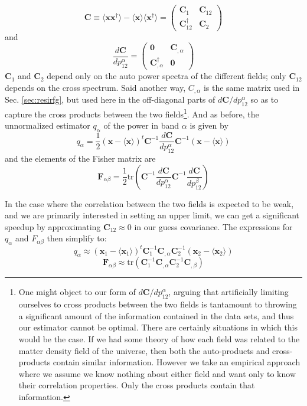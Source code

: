 \documentclass[numberedappendix]{emulateapj}
\newcommand{\Fb}{\mathbf{F}}
\newcommand{\Cb}{\mathbf{C}}
\newcommand{\xb}{\mathbf{x}}
\begin{document}
\begin{equation}
\Cb\equiv  \langle\xb\xb^\dagger\rangle-\langle\xb\rangle\langle\xb^\dagger\rangle=\left(\begin{matrix}\Cb_1 & \Cb_{12} \\ \Cb_{12}^\dagger & \Cb_2   \end{matrix}\right)
\end{equation}
and 
\begin{equation}
\frac{d\Cb}{dp_{12}^\alpha}=\left(\begin{matrix}\mathbf{0} & \Cb_{,\alpha}\\ \Cb_{,\alpha}^\dagger & \mathbf{0}   \end{matrix}\right)
\end{equation}
$\Cb_1$ and $\Cb_2$ depend only on the auto power spectra of the different fields; only $\Cb_{12}$ depends on the cross spectrum. Said another way, $C_{,\alpha}$ is the same matrix used in Sec. \ref{sec:resirfg}, but used here in the off-diagonal parts of $d\Cb/dp_{12}^\alpha$ so as to capture the cross products between the two fields\footnote{One might object to our form of $d\Cb/dp_{12}^\alpha$, arguing that artificially limiting ourselves to cross products between the two fields is tantamount to throwing a significant amount of the information contained in the data sets, and thus our estimator cannot be optimal. There are certainly situations in which this would be the case. If we had some theory of how each field was related to the matter density field of the universe, then both the auto-products and cross-products contain similar information. However we take an empirical approach where we assume we know nothing about either field and want only to know their correlation properties. Only the cross products contain that information.}. And as before, the unnormalized estimator $q_\alpha$ of the power in band $\alpha$ is given by
\begin{equation}
q_\alpha = \frac{1}{2}(\xb-\langle\xb\rangle)^t \Cb^{-1} \frac{d\Cb}{dp_{12}^\alpha}\Cb^{-1}(\xb-\langle\xb\rangle)
\end{equation}
and the elements of the Fisher matrix are
\begin{equation}
\Fb_{\alpha\beta}=\frac{1}{2}\text{tr}\left(\Cb^{-1} \frac{d\Cb}{dp_{12}^\alpha} \Cb^{-1}  \frac{d\Cb}{dp_{12}^\beta}  \right)	
\end{equation}

In the case where the correlation between the two fields is expected to be weak, and we are primarily interested in setting an upper limit, we can get a significant speedup by approximating $\Cb_{12}\approx0$ in our guess covariance. The expressions for $q_\alpha$ and $F_{\alpha\beta}$ then simplify to:
\begin{equation}
q_\alpha \approx (\xb_1-\langle\xb_1\rangle)^t \Cb_1^{-1} \Cb_{,\alpha}\Cb_2^{-1}(\xb_2-\langle\xb_2\rangle)
\end{equation}
\begin{equation}
\Fb_{\alpha\beta}\approx\text{tr}\left(\Cb_1^{-1} \Cb_{,\alpha} \Cb_2^{-1}  \Cb_{,\beta}  \right)	
\end{equation}
\end{document}
